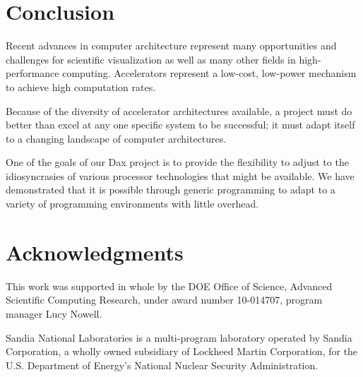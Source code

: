 \documentclass[conference]{IEEEtran}
\begin{document}
\section{Conclusion}
\label{sec:Conclusion}

\noindent
Recent advances in computer architecture represent many opportunities and
challenges for scientific visualization as well as many other fields in
high-performance computing.  Accelerators represent a low-cost, low-power
mechanism to achieve high computation rates.

Because of the diversity of accelerator architectures available, a project
must do better than excel at any one specific system to be successful; it
must adapt itself to a changing landscape of computer architectures.

One of the goals of our Dax project is to provide the flexibility to adjust
to the idiosyncrasies of various processor technologies that might be
available.  We have demonstrated that it is possible through generic
programming to adapt to a variety of programming environments with little
overhead.

\section*{Acknowledgments}

\noindent
This work was supported in whole by the DOE Office of Science, Advanced
Scientific Computing Research, under award number 10-014707, program
manager Lucy Nowell.

Sandia National Laboratories is a multi-program laboratory operated by
Sandia Corporation, a wholly owned subsidiary of Lockheed Martin
Corporation, for the U.S. Department of Energy's National Nuclear Security
Administration.



\end{document}

